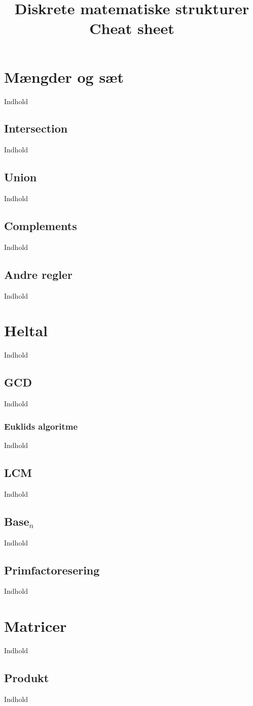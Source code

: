 \documentclass{article}
\title{Diskrete matematiske strukturer\\
          Cheat sheet}
\author {}
\date{}
\begin{document}
\maketitle
\tableofcontents
\clearpage
\section{Mængder og sæt}
  Indhold
  \subsection{Intersection}
    Indhold
  \subsection{Union}
    Indhold
  \subsection{Complements}
    Indhold
  \subsection{Andre regler}
    Indhold
\section{Heltal}
  Indhold
  \subsection{GCD}
    Indhold
    \subsubsection{Euklids algoritme}
      Indhold
  \subsection{LCM}
    Indhold
  \subsection{Base$_n$}
    Indhold
  \subsection{Primfactoresering}
    Indhold
\section{Matricer}
  Indhold
  \subsection{Produkt}
    Indhold
\end{document}
